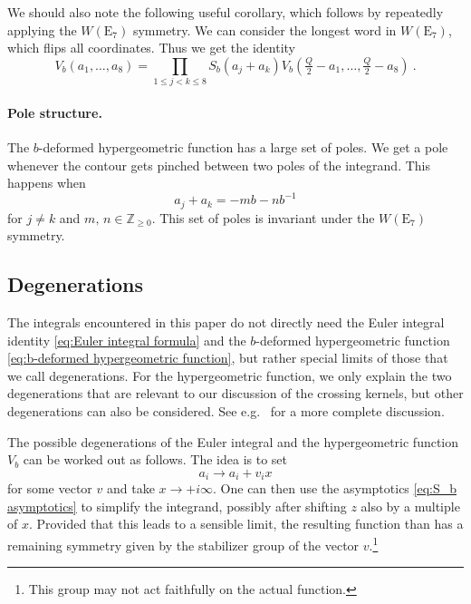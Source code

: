 \documentclass[12pt,a4paper]{article}
\newcommand{\be}{\begin{equation}}
\newcommand{\ee}{\end{equation}}
\newcommand\ZZ{\mathbb{Z}}
\begin{document}
We should also note the following useful corollary, which follows by repeatedly applying the $W(\mathrm{E}_7)$ symmetry. We can consider the longest word in $W(\mathrm{E}_7)$, which flips all coordinates. Thus we get the identity
\be 
V_b(a_1,\dots,a_8)=\prod_{1 \le j<k \le 8} S_b(a_j+a_k) V_b(\tfrac{Q}{2}-a_1,\dots,\tfrac{Q}{2}-a_8)\ . \label{eq:E7 symmetry total reflection}
\ee
\paragraph{Pole structure.} The $b$-deformed hypergeometric function has a large set of poles. We get a pole whenever the contour gets pinched between two poles of the integrand. This happens when
\be 
a_j+a_k=-mb-n b^{-1}
\ee
for $j \ne k$ and $m,\, n \in \ZZ_{\ge 0}$. This set of poles is invariant under the $W(\mathrm{E}_7)$ symmetry.


\subsection{Degenerations} \label{subapp:degenerations}
The integrals encountered in this paper do not directly need the Euler integral identity \eqref{eq:Euler integral formula} and the $b$-deformed hypergeometric function \eqref{eq:b-deformed hypergeometric function}, but rather special limits of those that we call degenerations.
For the hypergeometric function, we only explain the two degenerations that are relevant to our discussion of the crossing kernels, but other degenerations can also be considered. See e.g.\ \cite{VanDeBult} for a more complete discussion.

The possible degenerations of the Euler integral and the hypergeometric function $V_b$ can be worked out as follows. The idea is to set
\be 
a_i \to a_i+v_i x \label{eq:degeneration scaling}
\ee
for some vector $v$ and take $x \to +i \infty$. One can then use the asymptotics \eqref{eq:S_b asymptotics} to simplify the integrand, possibly after shifting $z$ also by a multiple of $x$.
Provided that this leads to a sensible limit, the resulting function than has a remaining symmetry given by the stabilizer group of the vector $v$.\footnote{This group may not act faithfully on the actual function.} 
\end{document}
